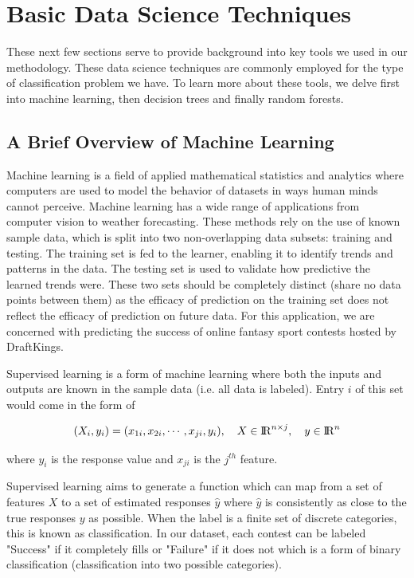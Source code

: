 \section{Basic Data Science Techniques}
These next few sections serve to provide background into key tools we used in our methodology. These data science techniques are commonly employed for the type of classification problem we have. To learn more about these tools, we delve first into machine learning, then decision trees and finally random forests. 

\subsection{A Brief Overview of Machine Learning}
Machine learning is a field of applied mathematical statistics and analytics where computers are used to model the behavior of datasets in ways human minds cannot perceive. Machine learning has a wide range of applications from computer vision to weather forecasting. These methods rely on the use of known sample data, which is split into two non-overlapping data subsets: training and testing. The training set is fed to the learner, enabling it to identify trends and patterns in the data. The testing set is used to validate how predictive the learned trends were. These two sets should be completely distinct (share no data points between them) as the efficacy of prediction on the training set does not reflect the efficacy of prediction on future data. For this application, we are concerned with predicting the success of online fantasy sport contests hosted by DraftKings. 


Supervised learning is a form of machine learning where both the inputs and outputs are known in the sample data (i.e. all data is labeled). Entry $i$ of this set would come in the form of

\begin{equation}
    (X_{i}, y_{i}) = (x_{1i}, x_{2i}, \cdots, x_{ji}, y_{i}), \quad X\in{\rm I\!R}^{n\times j}, \quad y\in{\rm I\!R}^{n}
\end{equation}


where $y_{i}$ is the response value and $x_{ji}$ is the $j^{th}$ feature.

Supervised learning aims to generate a function which can map from a set of features $X$ to a set of estimated responses $\hat{y}$ where $\hat{y}$ is consistently as close to the true responses $y$ as possible. When the label is a finite set of discrete categories, this is known as classification. In our dataset, each contest can be labeled "Success" if it completely fills or "Failure" if it does not which is a form of binary classification (classification into two possible categories).

